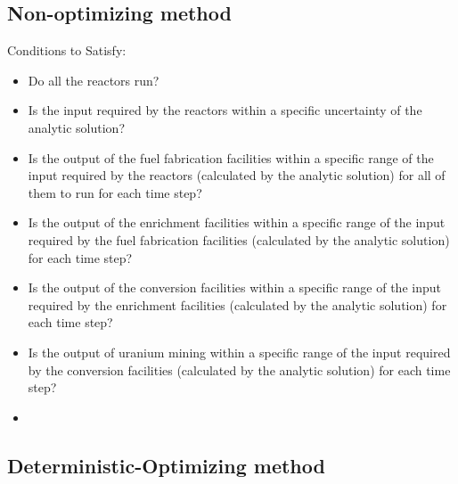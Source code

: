 \documentclass[12pt,letterpaper]{article}
\begin{document}
\subsection*{Non-optimizing method}
Conditions to Satisfy: 
\begin{itemize}
\item  Do all the reactors run? 
\item Is the input required by the reactors within a specific uncertainty of the analytic solution? 
\item  Is the output of the fuel fabrication facilities within a specific range of the input required by the reactors (calculated by the analytic solution) for all of them to run for each time step? 
\item  Is the output of the enrichment facilities within a specific range of the input required by the fuel fabrication facilities (calculated by the analytic solution) for each time step? 
\item Is the output of the conversion facilities within a specific range of the input required by the enrichment facilities (calculated by the analytic solution) for each time step? 
\item Is the output of uranium mining within a specific range of the input required by the conversion facilities (calculated by the analytic solution) for each time step? 
\item 
\end{itemize}

\subsection*{Deterministic-Optimizing method}
\end{document}

